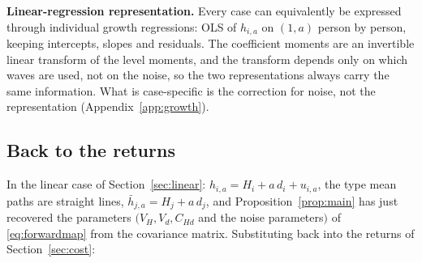 \documentclass[11pt]{article}
\theoremstyle{remark}
\begin{document}
\textbf{Linear-regression representation.} Every case can equivalently be expressed through individual growth regressions: OLS of $h_{i,a}$ on $(1,a)$ person by person, keeping intercepts, slopes and residuals.
The coefficient moments are an invertible linear transform of the level moments, and the transform depends only on which waves are used, not on the noise, so the two representations always carry the same information.
What is case-specific is the correction for noise, not the representation (Appendix~\ref{app:growth}).

\subsection{Back to the returns}\label{sec:back}

In the linear case of Section~\ref{sec:linear}: $h_{i,a}=H_i+a\,d_i+u_{i,a}$, the type mean paths are straight lines, $\bar h_{j,a}=H_j+a\,d_j$, and Proposition~\ref{prop:main} has just recovered the parameters $(V_H,V_d,C_{Hd}$ and the noise parameters$)$ of \eqref{eq:forwardmap} from the covariance matrix. Substituting back into the returns of Section~\ref{sec:cost}:
\end{document}
